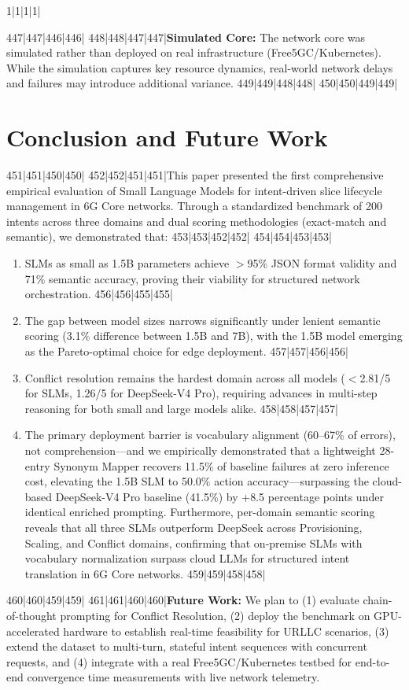 1|1|1|1|\documentclass[10pt,conference]{IEEEtran}
\begin{document}
447|447|446|446|
448|448|447|447|\textbf{Simulated Core:} The network core was simulated rather than deployed on real infrastructure (Free5GC/Kubernetes). While the simulation captures key resource dynamics, real-world network delays and failures may introduce additional variance.
449|449|448|448|
450|450|449|449|\section{Conclusion and Future Work}
451|451|450|450|
452|452|451|451|This paper presented the first comprehensive empirical evaluation of Small Language Models for intent-driven slice lifecycle management in 6G Core networks. Through a standardized benchmark of 200 intents across three domains and dual scoring methodologies (exact-match and semantic), we demonstrated that:
453|453|452|452|
454|454|453|453|\begin{enumerate}
455|455|454|454|    \item SLMs as small as 1.5B parameters achieve $>$95\% JSON format validity and 71\% semantic accuracy, proving their viability for structured network orchestration.
456|456|455|455|    \item The gap between model sizes narrows significantly under lenient semantic scoring (3.1\% difference between 1.5B and 7B), with the 1.5B model emerging as the Pareto-optimal choice for edge deployment.
457|457|456|456|    \item Conflict resolution remains the hardest domain across all models ($<$2.81/5 for SLMs, 1.26/5 for DeepSeek-V4 Pro), requiring advances in multi-step reasoning for both small and large models alike.
458|458|457|457|    \item The primary deployment barrier is vocabulary alignment (60--67\% of errors), not comprehension---and we empirically demonstrated that a lightweight 28-entry Synonym Mapper recovers 11.5\% of baseline failures at zero inference cost, elevating the 1.5B SLM to 50.0\% action accuracy---surpassing the cloud-based DeepSeek-V4 Pro baseline (41.5\%) by +8.5 percentage points under identical enriched prompting. Furthermore, per-domain semantic scoring reveals that all three SLMs outperform DeepSeek across Provisioning, Scaling, and Conflict domains, confirming that on-premise SLMs with vocabulary normalization surpass cloud LLMs for structured intent translation in 6G Core networks.
459|459|458|458|\end{enumerate}
460|460|459|459|
461|461|460|460|\textbf{Future Work:} We plan to (1) evaluate chain-of-thought prompting for Conflict Resolution, (2) deploy the benchmark on GPU-accelerated hardware to establish real-time feasibility for URLLC scenarios, (3) extend the dataset to multi-turn, stateful intent sequences with concurrent requests, and (4) integrate with a real Free5GC/Kubernetes testbed for end-to-end convergence time measurements with live network telemetry.
\end{document}
